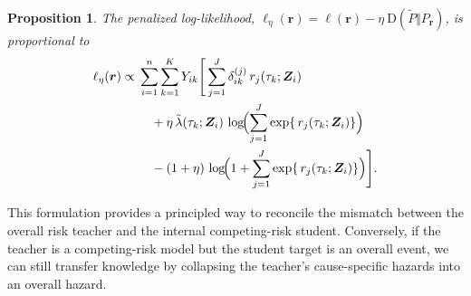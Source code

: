 \documentclass{article}
\theoremstyle{plain}
\newtheorem{proposition}[theorem]{Proposition}
\theoremstyle{definition}
\theoremstyle{remark}
\begin{document}
\begin{proposition}
  \label{prop3}
    The penalized log-likelihood, $\ell_{\eta}(\boldsymbol{r})=\ell(\boldsymbol{r})- \eta~ \mbox{D}(\tilde{P} \Vert  P_{\boldsymbol{r}})$, 
     is proportional to 
    \begin{align*}
    \ell_{\eta}(\bm r)
    \propto\;
    &\sum_{i=1}^n \sum_{k=1}^{K} Y_{ik}
    \Bigg[
    \sum_{j=1}^J \delta_{ik}^{(j)}\, r_j(\tau_k;\bm Z_i)
    \\
    &\quad
    + \eta\,\tilde{\lambda}(\tau_k;\bm Z_i)\,
    \log\!\Bigl(\sum_{j=1}^J \exp\{\,r_j(\tau_k;\bm Z_i)\}\Bigr)
    \\
    &\quad
    - (1+\eta)\,
    \log\!\Bigl(1+\sum_{j=1}^J \exp\{\,r_j(\tau_k;\bm Z_i)\}\Bigr)
    \Bigg].
    \end{align*}
\end{proposition}
This formulation provides a principled way to reconcile the mismatch between the overall risk teacher and the internal competing-risk student. 
Conversely, if the teacher is a competing-risk model but the student target is an overall event, we can still transfer knowledge by collapsing the teacher’s cause-specific hazards into an overall hazard.

\end{document}
